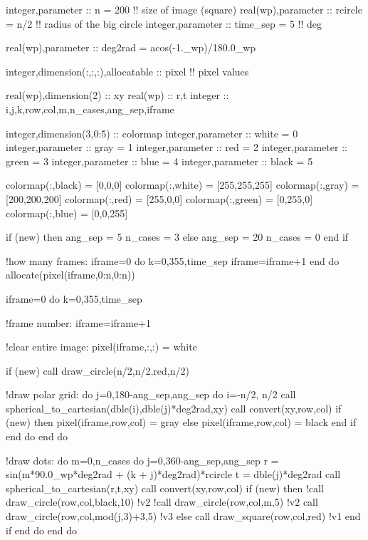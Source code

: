 integer,parameter \+:\+: n = 200 !! size of image (square) real(wp),parameter \+:\+: rcircle = n/2 !! radius of the big circle integer,parameter \+:\+: time\+\_\+sep = 5 !! deg

real(wp),parameter \+:\+: deg2rad = acos(-\/1.\+\_\+wp)/180.0\+\_\+wp

integer,dimension(\+:,\+:,\+:),allocatable \+:\+: pixel !! pixel values

real(wp),dimension(2) \+:\+: xy real(wp) \+:\+: r,t integer \+:\+: i,j,k,row,col,m,n\+\_\+cases,ang\+\_\+sep,iframe

integer,dimension(3,0\+:5) \+:\+: colormap integer,parameter \+:\+: white = 0 integer,parameter \+:\+: gray = 1 integer,parameter \+:\+: red = 2 integer,parameter \+:\+: green = 3 integer,parameter \+:\+: blue = 4 integer,parameter \+:\+: black = 5

colormap(\+:,black) = \mbox{[}0,0,0\mbox{]} colormap(\+:,white) = \mbox{[}255,255,255\mbox{]} colormap(\+:,gray) = \mbox{[}200,200,200\mbox{]} colormap(\+:,red) = \mbox{[}255,0,0\mbox{]} colormap(\+:,green) = \mbox{[}0,255,0\mbox{]} colormap(\+:,blue) = \mbox{[}0,0,255\mbox{]}

if (new) then ang\+\_\+sep = 5 n\+\_\+cases = 3 else ang\+\_\+sep = 20 n\+\_\+cases = 0 end if

!how many frames\+: iframe=0 do k=0,355,time\+\_\+sep iframe=iframe+1 end do allocate(pixel(iframe,0\+:n,0\+:n))

iframe=0 do k=0,355,time\+\_\+sep \begin{DoxyVerb}!frame number:
iframe=iframe+1

!clear entire image:
pixel(iframe,:,:) = white

if (new) call draw_circle(n/2,n/2,red,n/2)

!draw polar grid:
do j=0,180-ang_sep,ang_sep
    do i=-n/2, n/2
        call spherical_to_cartesian(dble(i),dble(j)*deg2rad,xy)
        call convert(xy,row,col)
        if (new) then
            pixel(iframe,row,col) = gray
        else
            pixel(iframe,row,col) = black
        end if
    end do
end do

!draw dots:
do m=0,n_cases
    do j=0,360-ang_sep,ang_sep
        r = sin(m*90.0_wp*deg2rad + (k + j)*deg2rad)*rcircle
        t = dble(j)*deg2rad
        call spherical_to_cartesian(r,t,xy)
        call convert(xy,row,col)
        if (new) then
            !call draw_circle(row,col,black,10)    !v2
            !call draw_circle(row,col,m,5)         !v2
            call draw_circle(row,col,mod(j,3)+3,5) !v3
        else
            call draw_square(row,col,red)          !v1
        end if
    end do
end do
\end{DoxyVerb}


